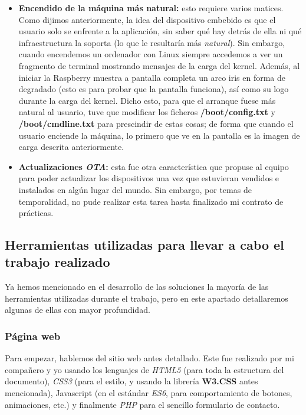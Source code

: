\documentclass[13pt]{scrartcl}
\begin{document}
\begin{itemize}
					\item \textbf{Encendido de la máquina más natural:} esto requiere varios matices. Como dijimos anteriormente, la idea del dispositivo embebido es que el usuario solo se enfrente a la aplicación, sin saber qué hay detrás de ella ni qué infraestructura la soporta (lo que le resultaría más \textit{natural}). Sin embargo, cuando encendemos un ordenador con Linux siempre accedemos a ver un fragmento de terminal mostrando mensajes de la carga del kernel. Además, al iniciar la Raspberry muestra a pantalla completa un arco iris en forma de degradado (esto es para probar que la pantalla funciona), así como su logo durante la carga del kernel. Dicho esto, para que el arranque fuese más natural al usuario, tuve que modificar los ficheros \textbf{/boot/config.txt} y \textbf{/boot/cmdline.txt} para prescindir de estas cosas; de forma que cuando el usuario enciende la máquina, lo primero que ve en la pantalla es la imagen de carga descrita anteriormente.
					\item \textbf{Actualizaciones \textit{OTA}:} esta fue otra característica que propuse al equipo para poder actualizar los dispositivos una vez que estuvieran vendidos e instalados en algún lugar del mundo. Sin embargo, por temas de temporalidad, no pude realizar esta tarea hasta finalizado mi contrato de prácticas.
				\end{itemize}
			
		\subsection{Herramientas utilizadas para llevar a cabo el trabajo realizado}
			Ya hemos mencionado en el desarrollo de las soluciones la mayoría de las herramientas utilizadas durante el trabajo, pero en este apartado detallaremos algunas de ellas con mayor profundidad.
			
			\subsubsection{Página web}
				Para empezar, hablemos del sitio web antes detallado. Este fue realizado por mi compañero y yo usando los lenguajes de \textit{HTML5} (para toda la estructura del documento), \textit{CSS3} (para el estilo, y usando la librería \textbf{W3.CSS} antes mencionada), Javascript (en el estándar \textit{ES6}, para comportamiento de botones, animaciones, etc.) y finalmente \textit{PHP} para el sencillo formulario de contacto.
				
\end{document}
